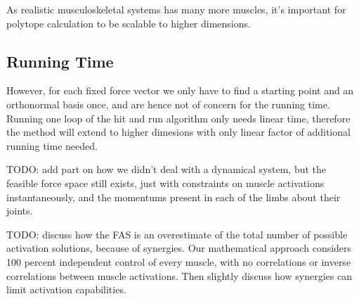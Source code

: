 As realistic musculoskeletal systems has many more muscles, it's important for polytope calculation to be scalable to higher dimensions.

\subsection{Running Time}
However, for each fixed force vector we only have to find a starting point and an orthonormal basis once, and are hence not of concern for the running time. Running one loop of the hit and run algorithm only needs linear time, therefore the method will extend to higher dimesions with only linear factor of additional running time needed.

TODO: add part on how we didn't deal with a dynamical system, but the feasible force space still exists, just with constraints on muscle activations instantaneously, and the momentums present in each of the limbs about their joints.

TODO: discuss how the FAS is an overestimate of the total number of possible activation solutions, because of synergies. Our mathematical approach considers 100 percent independent control of every muscle, with no correlations or inverse correlations between muscle activations. Then slightly discuss how synergies can limit activation capabilities.